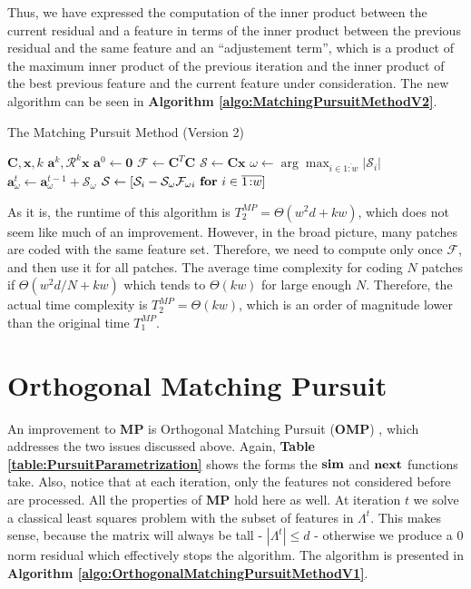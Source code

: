 \documentclass[12pt,a4paper,oneside,english]{UPBThesis}
\newcommand{\hcrange}[2]{\overline{{#1}\colon\!\!{#2}}}
\begin{document}
Thus, we have expressed the computation of the inner product between the current residual and a feature in terms of the inner product between the previous residual and the same feature and an ``adjustement term'', which is a product of the maximum inner product of the previous iteration and the inner product of the best previous feature and the current feature under consideration. The new algorithm can be seen in \textbf{Algorithm \ref{algo:MatchingPursuitMethodV2}}.

\begin{algorithm}
\caption{The Matching Pursuit Method (Version 2)}
\label{algo:MatchingPursuitMethodV2}
\begin{algorithmic}
\Require $\textbf{C},\textbf{x},k$
\Ensure $\textbf{a}^k,\mathcal{R}^k\textbf{x}$
\State $\textbf{a}^0 \gets \textbf{0}$
\State $\mathcal{F} \gets \textbf{C}^T\textbf{C}$
\State $\mathcal{S} \gets \textbf{C}\textbf{x}$
\For {$t = \hcrange{1}{k}$}
\State $\omega \gets \arg \max_{i \in \hcrange{1}{w}} \left| \mathcal{S}_i \right|$
\State $\textbf{a}_\omega^t \gets \textbf{a}_\omega^{t-1} + \mathcal{S}_\omega$
\State $\mathcal{S} \gets [ \mathcal{S}_i - \mathcal{S}_\omega \mathcal{F}_{\omega i} ~ \mbox{\textbf{for} $i \in \hcrange{1}{w}$} ]$
\EndFor
\end{algorithmic}
\end{algorithm}

As it is, the runtime of this algorithm is $T_2^{MP} = \Theta(w^2d + kw)$, which does not seem like much of an improvement. However, in the broad picture, many patches are coded with the same feature set. Therefore, we need to compute only once $\mathcal{F}$, and then use it for all patches. The average time complexity for coding $N$ patches if $\Theta(w^2d/N + kw)$ which tends to $\Theta(kw)$ for large enough $N$. Therefore, the actual time complexity is $T_2^{MP} = \Theta(kw)$, which is an order of magnitude lower than the original time $T_1^{MP}$.

\section{Orthogonal Matching Pursuit}
\label{ref:OrthogonalMatchingPursuit}

An improvement to \textbf{MP} is Orthogonal Matching Pursuit (\textbf{OMP}) \cite{matchingpursuit2,orthopursuit}, which addresses the two issues discussed above. Again, \textbf{Table \ref{table:PursuitParametrization}} shows the forms the $\text{\textbf{sim}}$ and $\text{\textbf{next}}$ functions take. Also, notice that at each iteration, only the features not considered before are processed. All the properties of \textbf{MP} hold here as well. At iteration $t$ we solve a classical least squares problem with the subset of features in $\Lambda^t$. This makes sense, because the matrix will always be tall - $\left| \Lambda^t \right| \leq d$ - otherwise we produce a $0$ norm residual which effectively stops the algorithm. The algorithm is presented in \textbf{Algorithm \ref{algo:OrthogonalMatchingPursuitMethodV1}}.
\end{document}
